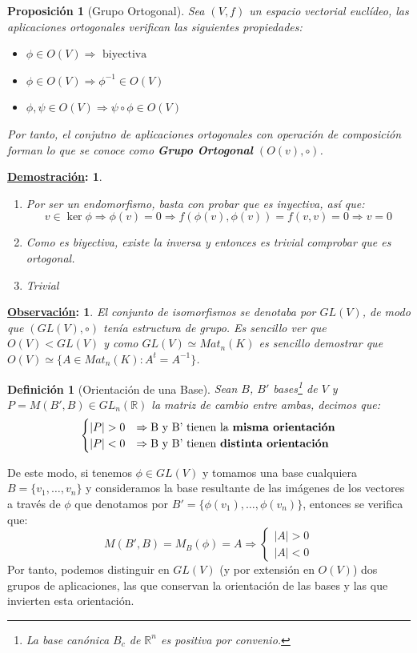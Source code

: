 \documentclass[10pt,a4paper,openright]{book}
\theoremstyle{break}
\newtheorem*{defi}{Definición}
\newtheorem*{prop}{Proposición}
\newtheorem*{demo}{\underline{Demostración}:}
\newtheorem*{obs}{\underline{Observación}:}
\begin{document}
\begin{prop}[Grupo Ortogonal]
Sea $(V,f)$ un espacio vectorial euclídeo, las aplicaciones ortogonales verifican las siguientes propiedades:
\begin{itemize}
\item $\phi \in O(V)\Rightarrow \mbox{ biyectiva}$
\item $\phi\in O(V)\Rightarrow \phi^{-1}\in O(V)$
\item $\phi,\psi \in O(V)\Rightarrow \psi \circ \phi \in O(V)$
\end{itemize}
Por tanto, el conjutno de aplicaciones ortogonales con operación de composición forman lo que se conoce como \textbf{Grupo Ortogonal} $\left(O(v),\circ \right)$.
\end{prop}
\begin{demo}
\begin{enumerate}
\item Por ser un endomorfismo, basta con probar que es inyectiva, así que:
$$v\in \ker \phi \Rightarrow \phi(v) = 0 \Rightarrow f(\phi (v), \phi (v)) = f(v,v) = 0 \Rightarrow v= 0$$
\item Como es biyectiva, existe la inversa y entonces es trivial comprobar que es ortogonal.
\item Trivial
\end{enumerate}
\end{demo}

\begin{obs}
El conjunto de isomorfismos se denotaba por $GL(V)$, de modo que $(GL(V),\circ)$ tenía estructura de grupo. Es sencillo ver que $O(V)<GL(V)$ y como $GL(V)\simeq Mat_n(K)$ es sencillo demostrar que $O(V)\simeq \{A\in Mat_n(K): A^t = A^{-1}\}$.
\end{obs}

\begin{defi}[Orientación de una Base]
Sean $B$, $B'$ bases\footnote{La base canónica $B_c$ de $\mathbb{R}^n$ es positiva por convenio.} de $V$ y $P=M(B',B) \in GL_n(\mathbb{R})$ la matriz de cambio entre ambas, decimos que:
$$\begin{cases} |P|>0 & \Rightarrow \mbox{B y B' tienen la \textbf{misma orientación}} \\ |P|<0 & \Rightarrow \mbox{B y B' tienen \textbf{distinta orientación}} \end{cases}$$
\end{defi}

De este modo, si tenemos $\phi \in GL(V)$ y tomamos una base cualquiera $B=\{ v_1, \ldots, v_n\}$ y consideramos la base resultante de las imágenes de los vectores a través de $\phi$ que denotamos por $B'=\{ \phi(v_1), \ldots, \phi(v_n)\}$, entonces se verifica que:
$$M(B', B) = M_B (\phi) = A\Rightarrow \begin{cases} |A| > 0 \\ |A| < 0 \end{cases}$$
Por tanto, podemos distinguir en $GL(V)$ (y por extensión en $O(V)$) dos grupos de aplicaciones, las que conservan la orientación de las bases y las que invierten esta orientación.
\end{document}
